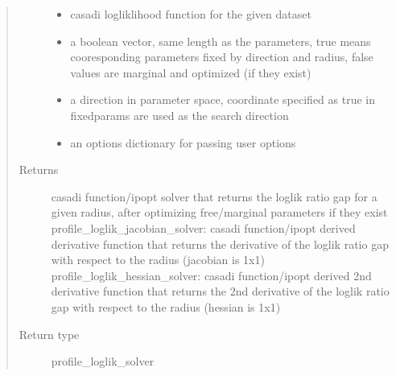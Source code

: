 \documentclass[letterpaper,10pt,english,openany,oneside]{sphinxmanual}
\begin{document}
\begin{fulllineitems}
\begin{fulllineitems}
\begin{quote}
\begin{description}
\begin{itemize}
\item {} 
 \textendash{} casadi logliklihood function for the given dataset

\item {} 
 \textendash{} a boolean vector,  same length as the parameters,  true means cooresponding parameters fixed by direction and radius,  false values are marginal and optimized (if they exist)

\item {} 
 \textendash{} a direction in parameter space,  coordinate specified as true in fixedparams are used as the search direction

\item {} 
 \textendash{} an options dictionary for passing user options

\end{itemize}

\item[{Returns}] \leavevmode
casadi function/ipopt solver that returns the loglik ratio gap for a given radius,  after optimizing free/marginal parameters if they exist
profile\_loglik\_jacobian\_solver: casadi function/ipopt derived derivative function that returns the derivative of the loglik ratio gap with respect to the radius (jacobian is 1x1)
profile\_loglik\_hessian\_solver: casadi function/ipopt derived 2nd derivative function that returns the 2nd derivative of the loglik ratio gap with respect to the radius (hessian is 1x1)

\item[{Return type}] \leavevmode
profile\_loglik\_solver

\end{description}\end{quote}

\end{fulllineitems}



\end{fulllineitems}
\end{document}
